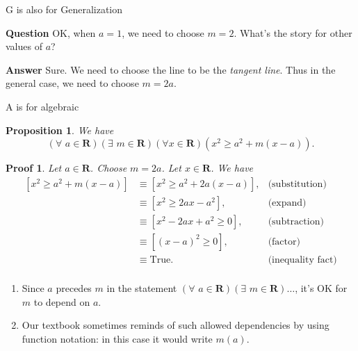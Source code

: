 \documentclass[usenames,dvipsnames,fleqn,leqno,10pt, pdflatex]{beamer}
\newcommand{\reals}{\mathbf{R}}
\newenvironment{PenList}{
  \begin{enumerate}[\textcolor{UNK-blue}{\PencilRightDown}]
    \addtolength{\itemsep}{-0.0\itemsep}}
  {\end{enumerate}}
\newtheorem{myprop}{Proposition}
\newtheorem{myproof}{Proof}
\begin{document}
\begin{frame}{G is also for Generalization}

\textbf{Question} OK, when $a=1$, we need to choose $m=2$. What's the story for other values of $a$?

\textbf{Answer} Sure.  We need to choose the line to be the \emph{tangent line}. Thus in the general case, we need to choose $m = 2 a$.

\vfill

\end{frame}
\begin{frame}{A is for algebraic}

\begin{myprop}We have
$$
\left(\forall \,\, a \in \reals\right)\left(\exists \,\, m \in \reals\right)\left (\forall x \in \reals \right) \left(x^2 \geq a^2 + m (x-a) \right).
$$
\end{myprop}

\begin{myproof} Let $a \in \reals$. Choose $m = 2 a$. Let $x \in \reals$. We have
\begin{align*}
    \left[x^2 \geq a^2 + m (x -a) \right] &\equiv \left[x^2 \geq a^2 + 2a  (x -a) \right],
       &\mbox{(substitution)}\\
       &\equiv \left[x^2 \geq 2 a x - a^2\right], &\mbox{(expand)}\\
        &\equiv \left[x^2 - 2 a x + a^2  \geq 0 \right], &\mbox{(subtraction)}\\
        &\equiv \left[(x-a)^2  \geq 0 \right ], &\mbox{(factor)}\\    
        &\equiv \mbox{True}.   &\mbox{(inequality fact)}\\
\end{align*}
\end{myproof}

\begin{PenList}
\item  Since $a$ precedes $m$ in the statement $\left(\forall \,\, a \in \reals\right)\left(\exists \,\, m \in \reals\right) \dots$, it's OK for
$m$ to depend on $a$.

\item Our textbook sometimes reminds of such allowed dependencies by using function notation: in this case it would write $m(a)$.

\end{PenList}
\end{frame}
\end{document}

